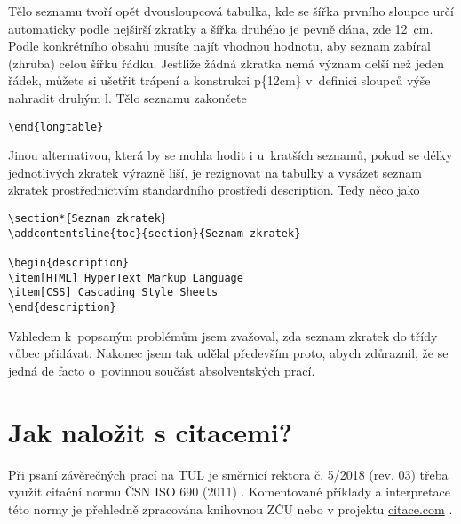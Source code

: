 \documentclass[FM,SP]{tulthesis}
\newcommand{\argument}[1]{{\ttfamily\color{\tulcolor}#1}}
\newenvironment{myquote}{\begin{list}{}{\setlength\leftmargin\parindent}\item[]}{\end{list}}
\newenvironment{listing}{\begin{myquote}\color{\tulcolor}}{\end{myquote}}
\begin{document}
Tělo seznamu tvoří opět dvousloupcová tabulka, kde se šířka prvního sloupce
určí automaticky podle nejširší zkratky a šířka druhého je pevně dána, zde
12~cm. Podle konkrétního obsahu musíte najít vhodnou hodnotu, aby seznam
zabíral (zhruba) celou šířku řádku. Jestliže žádná zkratka nemá význam delší
než jeden řádek, můžete si ušetřit trápení a konstrukci \argument{p\{12cm\}}
v~definici sloupců výše nahradit druhým \argument{l}. Tělo seznamu zakončete

\begin{listing}
\begin{verbatim}
\end{longtable}
\end{verbatim}
\end{listing}

Jinou alternativou, která by se mohla hodit i u~kratších seznamů, pokud se
délky jednotlivých zkratek výrazně liší, je rezignovat na tabulky a vysázet
seznam zkratek prostřednictvím standardního prostředí \argument{description}.
Tedy něco jako

\begin{listing}
\begin{verbatim}
\section*{Seznam zkratek}
\addcontentsline{toc}{section}{Seznam zkratek}

\begin{description}
\item[HTML] HyperText Markup Language
\item[CSS] Cascading Style Sheets
\end{description}
\end{verbatim}
\end{listing}

Vzhledem k~popsaným problémům jsem zvažoval, zda seznam zkratek do třídy vůbec
přidávat. Nakonec jsem tak udělal především proto, abych zdůraznil, že se jedná
de facto o~povinnou součást absolventských prací.

\chapter{Jak naložit s citacemi?}

Při psaní závěrečných prací na TUL je směrnicí rektora č. 5/2018 (rev. 03) třeba využít citační normu ČSN ISO 690 (2011) \cite{csniso690}. Komentované příklady a interpretace této normy je přehledně zpracována knihovnou ZČU nebo v projektu \hyperlink{citace.com}{citace.com} \cite{csniso690ZCU,webCitaceCOM}.
\end{document}
